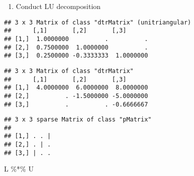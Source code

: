\documentclass[
]{article}
\newenvironment{Shaded}{\begin{snugshade}}{\end{snugshade}}
\newcommand{\FunctionTok}[1]{\textcolor[rgb]{0.00,0.00,0.00}{#1}}
\newcommand{\NormalTok}[1]{#1}
\newcommand{\OtherTok}[1]{\textcolor[rgb]{0.56,0.35,0.01}{#1}}
\newcommand{\SpecialCharTok}[1]{\textcolor[rgb]{0.00,0.00,0.00}{#1}}
\providecommand{\tightlist}{%
  \setlength{\itemsep}{0pt}\setlength{\parskip}{0pt}}
\begin{document}
\begin{enumerate}
\def\labelenumi{\arabic{enumi}.}
\setcounter{enumi}{10}
\tightlist
\item
  Conduct LU decomposition
\end{enumerate}

\begin{Shaded}
\end{Shaded}

\begin{verbatim}
## 3 x 3 Matrix of class "dtrMatrix" (unitriangular)
##      [,1]       [,2]       [,3]      
## [1,]  1.0000000          .          .
## [2,]  0.7500000  1.0000000          .
## [3,]  0.2500000 -0.3333333  1.0000000
\end{verbatim}

\begin{Shaded}
\end{Shaded}

\begin{verbatim}
## 3 x 3 Matrix of class "dtrMatrix"
##      [,1]       [,2]       [,3]      
## [1,]  4.0000000  6.0000000  8.0000000
## [2,]          . -1.5000000 -5.0000000
## [3,]          .          . -0.6666667
\end{verbatim}

\begin{Shaded}
\end{Shaded}

\begin{verbatim}
## 3 x 3 sparse Matrix of class "pMatrix"
##           
## [1,] . . |
## [2,] . | .
## [3,] | . .
\end{verbatim}

\begin{Shaded}
\begin{Highlighting}[]
\NormalTok{L }\SpecialCharTok{\%*\%}\NormalTok{ U}
\end{Highlighting}
\end{Shaded}
\end{document}
